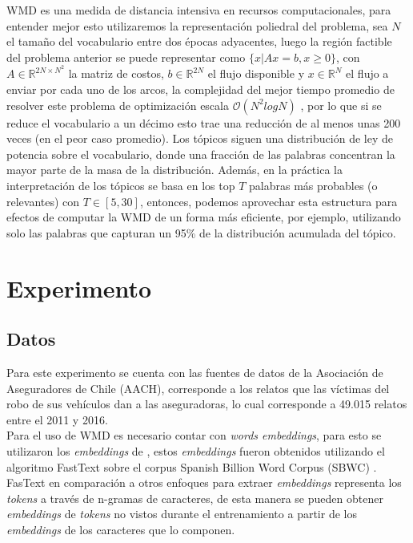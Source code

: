 \documentclass[letterpaper,12pt,oneside]{book} %
\begin{document}
WMD es una medida de distancia intensiva en recursos computacionales, para entender mejor esto utilizaremos la representación poliedral del problema, sea $N$ el tamaño del vocabulario entre dos épocas adyacentes, luego la región factible del problema anterior se puede representar como $\{x| Ax=b, x\geq 0\}$, con $A\in \mathbb{R}^{2N\times N^{2}}$ la matriz de costos, $b\in \mathbb{R}^{2N}$ el flujo disponible y $x\in \mathbb{R}^{N}$ el flujo a enviar por cada uno de los arcos, la complejidad del mejor tiempo promedio de resolver este problema de optimización escala $\mathcal{O}(N^{2}log N)$ \citep{pele2009fast}, por lo que si se reduce el vocabulario a un décimo esto trae una reducción de al menos unas 200 veces (en el peor caso promedio). Los tópicos siguen una distribución de ley de potencia sobre el vocabulario, donde una fracción de las palabras concentran la mayor parte de la masa de la distribución. Además, en la práctica la interpretación de los tópicos se basa en los top $T$ palabras más probables (o relevantes) con $T \in [5, 30]$, entonces, podemos aprovechar esta estructura para efectos de computar la WMD de un forma más eficiente, por ejemplo, utilizando solo las palabras que capturan un 95\% de la distribución acumulada del tópico.

\chapter{Experimento}

\section{Datos}

Para este experimento se cuenta con las fuentes de datos de la Asociación de Aseguradores de Chile (AACH), corresponde a los relatos que las víctimas del robo de sus vehículos dan a las aseguradoras, lo cual corresponde a 49.015 relatos entre el 2011 y 2016.\\



Para el uso de WMD es necesario contar con \textit{words embeddings}, para esto se utilizaron los \textit{embeddings} de \citep{fastextSBWC}, estos \textit{embeddings} fueron obtenidos utilizando el algoritmo FastText \citep{bojanowski2017enriching} sobre el corpus Spanish Billion Word Corpus (SBWC) \citep{cardellinoSBWCE}. FasText en comparación a otros enfoques para extraer \textit{embeddings} representa los \textit{tokens} a través de n-gramas de caracteres, de esta manera se pueden obtener \textit{embeddings} de \textit{tokens} no vistos durante el entrenamiento a partir de los \textit{embeddings} de los caracteres que lo componen.
\end{document}
